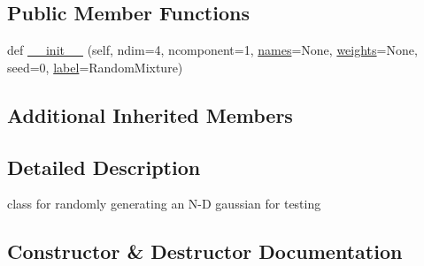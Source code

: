 \subsection*{Public Member Functions}
\begin{DoxyCompactItemize}
\item 
def \mbox{\hyperlink{classgetdist_1_1gaussian__mixtures_1_1RandomTestMixtureND_abd42397538709ca9e5e3f4206d47c74e}{\+\_\+\+\_\+init\+\_\+\+\_\+}} (self, ndim=4, ncomponent=1, \mbox{\hyperlink{classgetdist_1_1gaussian__mixtures_1_1MixtureND_ad26124d47b68d38fa8e90bc135769e6b}{names}}=None, \mbox{\hyperlink{classgetdist_1_1gaussian__mixtures_1_1MixtureND_a7fbae73d771ec0e1ca1f80558ad3b08b}{weights}}=None, seed=0, \mbox{\hyperlink{classgetdist_1_1gaussian__mixtures_1_1MixtureND_aa9a7187396fe46246dc62e921c17302c}{label}}=\textquotesingle{}Random\+Mixture\textquotesingle{})
\end{DoxyCompactItemize}
\subsection*{Additional Inherited Members}


\subsection{Detailed Description}
\begin{DoxyVerb}class for randomly generating an N-D gaussian for testing
\end{DoxyVerb}
 

\subsection{Constructor \& Destructor Documentation}
\mbox{\label{classgetdist_1_1gaussian__mixtures_1_1RandomTestMixtureND_abd42397538709ca9e5e3f4206d47c74e}} 
